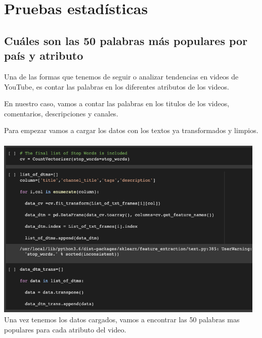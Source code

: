 \documentclass[a4paper,12pt]{article}
\begin{document}
\section[item_pruebas]{Pruebas estad\'isticas}
\subsection{Cu\'ales son las 50 palabras m\'as populares por pa\'is y atributo}

Una de las formas que tenemos de seguir o analizar tendencias en videos de YouTube, es contar las palabras en los diferentes atributos de los videos.

En nuestro caso, vamos a contar las palabras en los titulos de los videos, comentarios, descripciones y canales.

Para empezar vamos a cargar los datos con los textos ya transformados y limpios.
\\
\\
\includegraphics[width=13cm]{50_words_1.png}
\\

Una vez tenemos los datos cargados, vamos a encontrar las 50 palabras mas populares para cada atributo del video.
\end{document}
